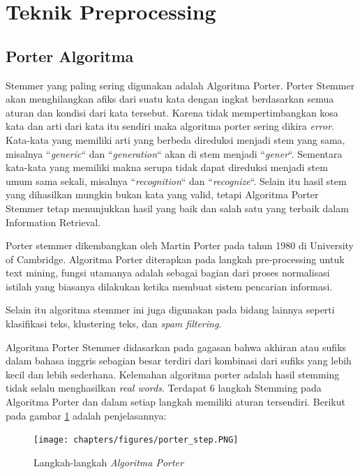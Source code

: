 \section{Teknik Preprocessing}
    \subsection{Porter Algoritma}
        Stemmer yang paling sering digunakan adalah Algoritma Porter. 
        Porter Stemmer akan menghilangkan afiks dari suatu kata dengan ingkat berdasarkan semua aturan dan kondisi dari kata tersebut. 
        Karena tidak mempertimbangkan kosa kata dan arti dari kata itu sendiri maka algoritma porter sering dikira \textit{error}. 
        Kata-kata yang memiliki arti yang berbeda direduksi menjadi stem yang sama, misalnya ``\textit{generic}`` dan ``\textit{generation}`` akan di stem menjadi ``\textit{gener}``. 
        Sementara kata-kata yang memiliki makna serupa tidak dapat direduksi menjadi stem umum sama sekali, misalnya ``\textit{recognition}`` dan ``\textit{recognize}``. 
        Selain itu hasil stem yang dihasilkan mungkin bukan kata yang valid, tetapi Algoritma Porter Stemmer tetap menunjukkan hasil yang baik dan salah satu yang terbaik dalam Information Retrieval.
        \par Porter stemmer dikembangkan oleh Martin Porter pada tahun 1980 di University of Cambridge. 
        Algoritma Porter diterapkan pada langkah pre-processing untuk text mining, fungsi utamanya adalah sebagai bagian dari proses normalisasi istilah yang biasanya dilakukan ketika membuat sistem pencarian informasi. 
        \par Selain itu algoritma stemmer ini juga digunakan pada bidang lainnya seperti klasifikasi teks, klustering teks, dan \textit{spam filtering}. 
        \par Algoritma Porter Stemmer didasarkan pada gagasan bahwa akhiran atau sufiks dalam bahasa inggris sebagian besar terdiri dari kombinasi dari sufiks yang lebih kecil dan lebih sederhana. 
        Kelemahan algoritma porter adalah hasil stemming tidak selalu menghasilkan \textit{real words}.
        Terdapat 6 langkah Stemming pada Algoritma Porter dan dalam setiap langkah memiliki aturan tersendiri. Berikut pada gambar \ref{6step} adalah penjelasannya:
       
        \begin{figure}
            \centerline {\texttt{[image: chapters/figures/porter\_step.PNG]}}
            \caption{Langkah-langkah \textit{Algoritma Porter}}
            \label{6step}
        \end{figure}

